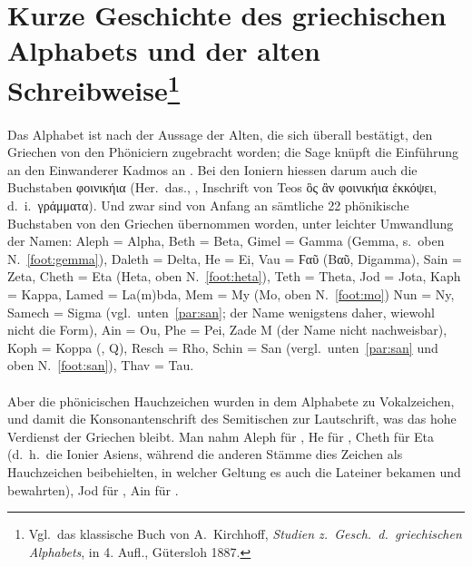 \section[Kurze Geschichte des griechischen Alphabets und der alten
  Schreibweise]{Kurze Geschichte des griechischen Alphabets und der alten
  Schreibweise\protect\footnote{Vgl.\ das klassische Buch von A.~Kirchhoff,
	  \emph{Studien
		  z.~Gesch.~d.~griechischen Alphabets}, in 4. Aufl., Gütersloh
	  1887.}}\label{sec:kurzgeschischte}


\paragraph{} Das Alphabet ist nach der Aussage der Alten, die sich überall bestätigt, den
Griechen von den Phöniciern zugebracht worden; die Sage knüpft die Einführung an
den Einwanderer Kadmos an . Bei den Ioniern hiessen darum auch die
Buchstaben φοινικήια (Her.\ das., , Inschrift von Teos
 ὃς ἂν φοινικήια ἐκκόψει, d.~i.~γράμματα). Und zwar sind von
Anfang an sämtliche 22 phönikische Buchstaben von den Griechen übernommen
worden, unter leichter Umwandlung der Namen: Aleph = Alpha, Beth = Beta, Gimel =
Gamma (Gemma, s.~oben N.~\ref{foot:gemma}), Daleth = Delta, He = Ei, Vau = Ϝαῦ (Βαῦ,
Digamma), Sain = Zeta, Cheth = Eta (Heta, oben
N.~\ref{foot:heta}), Teth = Theta, Jod =
Jota, Kaph = Kappa, Lamed = La{(m)}bda, Mem = My (Mo, oben N.~\ref{foot:mo}) Nun = Ny,
Samech = Sigma (vgl.\ unten~\ref{par:san}; der Name wenigstens daher, wiewohl nicht
die Form), Ain = Ou, Phe = Pei, Zade  Μ (der Name  nicht nachweisbar),
Koph = Koppa (,  Q), Resch = Rho, Schin = San (vergl.\
unten~\ref{par:san} und oben
N.~\ref{foot:san}), Thav = Tau.

\paragraph{\label{par:phenichauc}} Aber die phönicischen Hauchzeichen wurden in dem 
Alphabete zu Vokalzeichen, und damit die Konsonantenschrift des Semitischen zur
Lautschrift, was das hohe Verdienst der Griechen bleibt. Man nahm Aleph für ,
He für \ipa{e}, Cheth für Eta (d.~h.~die Ionier Asiens, während die anderen Stämme
dies Zeichen als Hauchzeichen beibehielten, in welcher Geltung es auch die
Lateiner bekamen und bewahrten), Jod für \ipa{i}, Ain für \ipa{o}.

